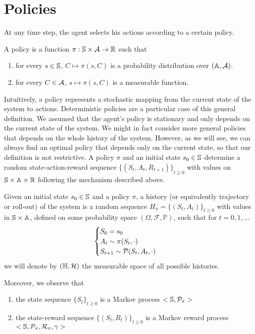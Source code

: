 \section{Policies}
At any time step, the agent selects his actions according to a certain policy. 
\begin{definition}[Policy]
	A policy is a function $\pi: \S \times \calA \to \R$ such that
	\begin{enumerate}[label={\roman*)}]
		\item for every $s \in \S$, $C \mapsto \pi(s,C)$ is a probability
			  distribution over $(\A, \calA)$. 
		\item for every $C \in \calA$, $s \mapsto \pi(s, C)$ is a measurable
			  function. 
	\end{enumerate}
\end{definition}
Intuitively, a policy represents a stochastic mapping from the current state of
the system to actions. Deterministic policies are a particular case of this 
general definition. We assumed that the agent's policy is stationary and only
depends on the current state of the system. We might in fact  consider more 
general policies that depends on the whole history of the system. However, as
we will see, we can always find an optimal policy that depends only on the
current state, so that our definition is not restrictive. A policy $\pi$ and an
initial state $s_0 \in \S$ determine a random state-action-reward sequence
${\{(S_t, A_t, R_{t+1})\}}_{t\geq 0}$ with values on $\S \times \A \times \R$
following the mechanism described above. 
\begin{definition}[History]
	Given an initial state $s_0 \in \S$ and a policy $\pi$, a history (or
	equivalently trajectory or roll-out) of the system is a random sequence
	$H_\pi = {\{(S_t, A_t)\}}_{t\geq 0}$ with values in $\S \times \A$, defined
	on some probability space $(\Omega, \mathcal{F}, \mathbb{P})$, such that for 
	$t = 0, 1, \ldots$
	\begin{equation}
		\begin{cases}
			S_0 = s_0\\
			A_t \sim \pi(S_t, \cdot)\\
			S_{t+1} \sim \calP(S_t, A_t, \cdot)\\
		\end{cases}
	\end{equation}
	we will denote by $(\H, \calH)$ the measurable space of all possible
	histories. 
\end{definition}
Moreover, we observe that
\begin{enumerate}[label={\roman*)}]
	\item the state sequence ${\{S_t\}}_{t\geq 0}$ is a Markov process $<\S,
		  \calP_\pi>$
	  \item the state-reward sequence ${\{(S_t, R_t)\}}_{t\geq 0}$ is a Markov 
		  reward process $<\S, \calP_\pi, \calR_\pi, \gamma>$
\end{enumerate}

